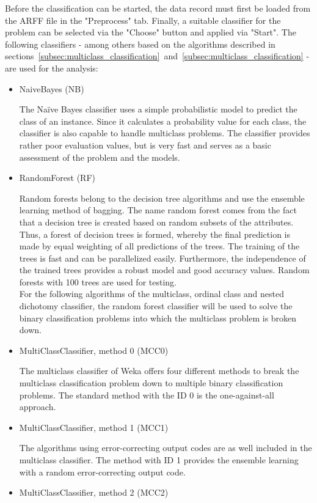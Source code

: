 \documentclass[article,type=msc,colorback,accentcolor=tud7b]{tudthesis}
\begin{document}
    Before the classification can be started, the data record must first be loaded from the ARFF file in the "Preprocess" tab. Finally, a suitable classifier for the problem can be selected via the "Choose" button and applied via "Start". The following classifiers - among others based on the algorithms described in sections~\ref{subsec:multiclass_classification}~and~\ref{subsec:multiclass_classification} - are used for the analysis:
    \begin{itemize}
      \item NaiveBayes (NB)

        The Naïve Bayes classifier uses a simple probabilistic model to predict the class of an instance. Since it calculates a probability value for each class, the classifier is also capable to handle multiclass problems. The classifier provides rather poor evaluation values, but is very fast and serves as a basic assessment of the problem and the models.
      \item RandomForest (RF)

        Random forests belong to the decision tree algorithms and use the ensemble learning method of bagging. The name random forest comes from the fact that a decision tree is created based on random subsets of the attributes. Thus, a forest of decision trees is formed, whereby the final prediction is made by equal weighting of all predictions of the trees. The training of the trees is fast and can be parallelized easily. Furthermore, the independence of the trained trees provides a robust model and good accuracy values. Random forests with 100 trees are used for testing. \\
For the following algorithms of the multiclass, ordinal class and nested dichotomy classifier, the random forest classifier will be used to solve the binary classification problems into which the multiclass problem is broken down.
      \item MultiClassClassifier, method 0 (MCC0)

        The multiclass classifier of Weka offers four different methods to break the multiclass classification problem down to multiple binary classification problems. The standard method with the ID 0 is the one-against-all approach.
      \item MultiClassClassifier, method 1 (MCC1)

        The algorithms using error-correcting output codes are as well included in the multiclass classifier. The method with ID 1 provides the ensemble learning with a random error-correcting output code.
      \item MultiClassClassifier, method 2 (MCC2)


\end{itemize}
\end{document}
